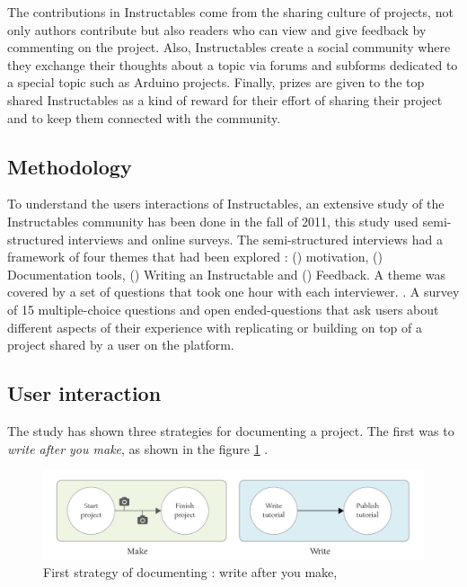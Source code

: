The contributions in Instructables come from the sharing culture of projects, not only authors contribute but also readers who can view and give feedback by commenting on the project. Also, Instructables create a social community where they exchange their thoughts about a topic via forums and subforms dedicated to a special topic such as Arduino projects. Finally, prizes are given to the top shared Instructables as a kind of reward for their effort of sharing their project and to keep them connected with the community.

\subsection{Methodology} 

To understand the users interactions of Instructables, an extensive study of the Instructables community has been done in the fall of 2011, this study used semi-structured interviews and online surveys. The semi-structured interviews had a framework of four themes that had been explored : () motivation, () Documentation tools, () Writing an Instructable and () Feedback. A theme was covered by a set of questions that took one hour with each interviewer. \cite{scholar:Tseng:2014:PVP:2598510.2598540}. A survey of 15 multiple-choice questions and open ended-questions that ask users about different aspects of their experience with replicating or building on top of a project shared by a user on the platform.

\subsection{User interaction}

The study has shown three strategies for documenting a project. The first was to \textit{write after you make}, as shown in the figure \ref{img-writemake}  \cite{tseng2016making}.
\begin{figure}[ht!]
	\includegraphics[scale=0.34]{./images/img-writemake.png}
	\caption{First strategy of documenting : write after you make, \cite{tseng2016making}}
	\label{img-writemake}
\end{figure}

